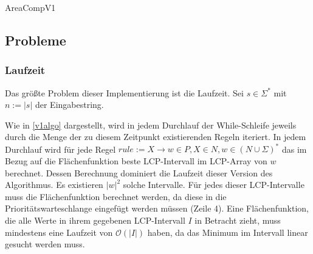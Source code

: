 \begin{algorithm}[t]
    \caption{AreaCompV1}
    \label{v1algo}
\end{algorithm}

\subsection{Probleme}

\subsubsection{Laufzeit}
\label{v1problemruntime}

Das größte Problem dieser Implementierung ist die Laufzeit. Sei $s \in \Sigma^*$ mit $n := |s|$ der Eingabestring.

Wie in \autoref{v1algo} dargestellt, wird in jedem Durchlauf der While-Schleife jeweils durch die Menge der zu diesem Zeitpunkt existierenden Regeln iteriert. 
In jedem Durchlauf wird für jede Regel $rule := X \rightarrow w \in P, X \in N, w \in (N \cup \Sigma)^*$ das im Bezug auf die Flächenfunktion beste LCP-Intervall im LCP-Array von $w$ berechnet. Dessen Berechnung dominiert die Laufzeit dieser Version des Algorithmus. 
Es existieren $|w|^2$ solche Intervalle. Für jedes dieser LCP-Intervalle muss die Flächenfunktion berechnet werden, da diese in die Prioritätswarteschlange eingefügt werden müssen (Zeile 4). Eine Flächenfunktion, die alle Werte in ihrem gegebenen LCP-Intervall $I$ in Betracht zieht, muss mindestens eine Laufzeit von $\mathcal{O}(|I|)$ haben, da das Minimum im Intervall linear gesucht werden muss.

